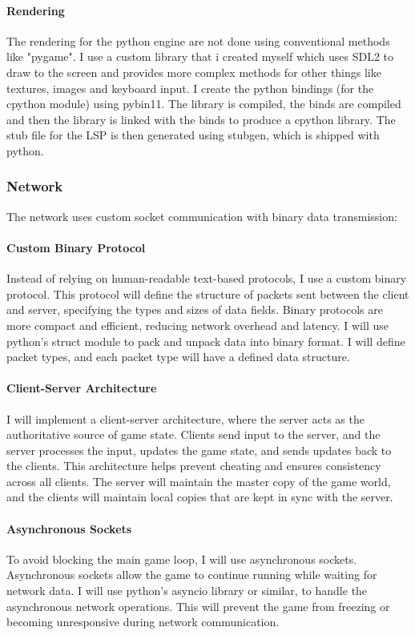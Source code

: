 \documentclass{article}
\begin{document}
\paragraph{Rendering}
The rendering for the python engine are not done using conventional methods like "pygame". I use a custom library that i created myself which uses SDL2 to draw to the screen and provides more complex methods for other things like textures, images and keyboard input. I create the python bindings (for the cpython module) using pybin11. The library is compiled, the binds are compiled and then the library is linked with the binds to produce a cpython library. The stub file for the LSP is then generated using stubgen, which is shipped with python.

\subsubsection{Network}

The network uses custom socket communication with binary data transmission:

\paragraph{Custom Binary Protocol}
Instead of relying on human-readable text-based protocols, I use a custom binary protocol. This protocol will define the structure of packets sent between the client and server, specifying the types and sizes of data fields. Binary protocols are more compact and efficient, reducing network overhead and latency. I will use python's struct module to pack and unpack data into binary format. I will define packet types, and each packet type will have a defined data structure.

\paragraph{Client-Server Architecture}
I will implement a client-server architecture, where the server acts as the authoritative source of game state. Clients send input to the server, and the server processes the input, updates the game state, and sends updates back to the clients. This architecture helps prevent cheating and ensures consistency across all clients. The server will maintain the master copy of the game world, and the clients will maintain local copies that are kept in sync with the server.

\paragraph{Asynchronous Sockets}
To avoid blocking the main game loop, I will use asynchronous sockets. Asynchronous sockets allow the game to continue running while waiting for network data. I will use python's asyncio library or similar, to handle the asynchronous network operations. This will prevent the game from freezing or becoming unresponsive during network communication.
\end{document}
